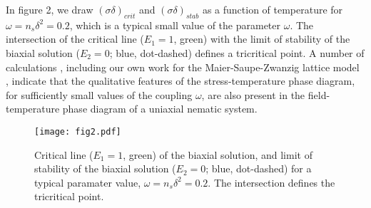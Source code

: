 \documentclass[aps,pre,reprint,amsmath,amssymbols,superscriptaddress,
nofootinbib]{revtex4-1}
\begin{document}
In figure 2, we draw $\left(  \sigma\delta\right)_{crit}$ and $\left(
\sigma\delta\right)  _{stab}$ as a function of temperature for $\omega
=n_{s}\delta^{2}=0.2$, which is a typical small value of the parameter $\omega$.
The intersection of the critical line ($E_{1}=1$, green) with the limit of
stability of the biaxial solution ($E_{2}=0$; blue, dot-dashed) defines a
tricritical point. A number of calculations \cite{Palffy1983,Frisken1987,
Gramsbergen1986}, including our own work for the
Maier-Saupe-Zwanzig lattice model \cite{Petri2016}, indicate that the
qualitative features of the stress-temperature phase diagram, for sufficiently
small values of the coupling $\omega$, are also present in the
field-temperature phase diagram of a uniaxial nematic system.%
\begin{figure}
[ptb]
\begin{center}
\texttt{[image: fig2.pdf]}%
\caption{Critical line ($E_{1}=1$, green) of the biaxial solution, and limit
of stability of the biaxial solution ($E_{2}=0$; blue, dot-dashed) for a
typical paramater value, $\omega=n_{s}\delta^{2}=0.2$. The intersection
defines the tricritical point.}%
\end{center}
\end{figure}
\end{document}

